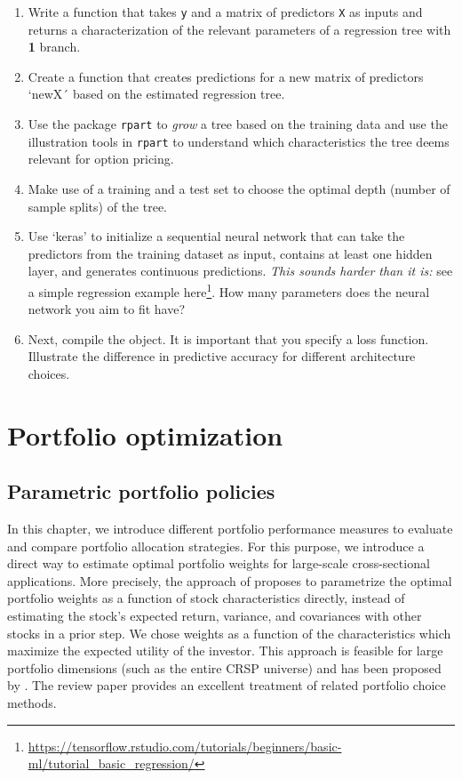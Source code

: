 \documentclass[
]{book}
\providecommand{\tightlist}{%
  \setlength{\itemsep}{0pt}\setlength{\parskip}{0pt}}
\renewcommand{\href}[2]{#2\footnote{\url{#1}}}
\begin{document}
\begin{enumerate}
\def\labelenumi{\arabic{enumi}.}
\tightlist
\item
  Write a function that takes \texttt{y} and a matrix of predictors \texttt{X} as inputs and returns a characterization of the relevant parameters of a regression tree with \textbf{1} branch.
\item
  Create a function that creates predictions for a new matrix of predictors `newX´ based on the estimated regression tree.
\item
  Use the package \texttt{rpart} to \emph{grow} a tree based on the training data and use the illustration tools in \texttt{rpart} to understand which characteristics the tree deems relevant for option pricing.
\item
  Make use of a training and a test set to choose the optimal depth (number of sample splits) of the tree.
\item
  Use `keras' to initialize a sequential neural network that can take the predictors from the training dataset as input, contains at least one hidden layer, and generates continuous predictions. \emph{This sounds harder than it is: }see a simple \href{https://tensorflow.rstudio.com/tutorials/beginners/basic-ml/tutorial_basic_regression/}{regression example here}. How many parameters does the neural network you aim to fit have?
\item
  Next, compile the object. It is important that you specify a loss function. Illustrate the difference in predictive accuracy for different architecture choices.
\end{enumerate}

\hypertarget{part-portfolio-optimization}{%
\part*{Portfolio optimization}\label{part-portfolio-optimization}}


\hypertarget{parametric-portfolio-policies}{%
\chapter{Parametric portfolio policies}\label{parametric-portfolio-policies}}

In this chapter, we introduce different portfolio performance measures to evaluate and compare portfolio allocation strategies.
For this purpose, we introduce a direct way to estimate optimal portfolio weights for large-scale cross-sectional applications. More precisely, the approach of \citet{Brandt2009} proposes to parametrize the optimal portfolio weights as a function of stock characteristics directly, instead of estimating the stock's expected return, variance, and covariances with other stocks in a prior step.
We chose weights as a function of the characteristics which maximize the expected utility of the investor. This approach is feasible for large portfolio dimensions (such as the entire CRSP universe) and has been proposed by \citet{Brandt2009}. The review paper \citet{Brandt2010} provides an excellent treatment of related portfolio choice methods.
\end{document}
